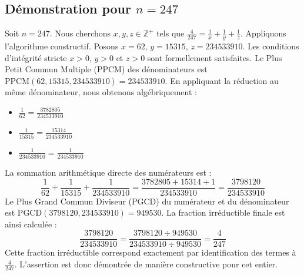 \documentclass[11pt,a4paper]{article}
\begin{document}
\subsection{Démonstration pour $n = 247$}
Soit $n = 247$. Nous cherchons $x, y, z \in \mathbb{Z}^{+}$ tels que $\frac{4}{247} = \frac{1}{x} + \frac{1}{y} + \frac{1}{z}$.
Appliquons l'algorithme constructif. Posons $x = 62$, $y = 15315$, $z = 234533910$.
Les conditions d'intégrité stricte $x > 0$, $y > 0$ et $z > 0$ sont formellement satisfaites.
Le Plus Petit Commun Multiple (PPCM) des dénominateurs est $\text{PPCM}(62, 15315, 234533910) = 234533910$.
En appliquant la réduction au même dénominateur, nous obtenons algébriquement :
\begin{itemize}
    \item $\frac{1}{62} = \frac{3782805}{234533910}$
    \item $\frac{1}{15315} = \frac{15314}{234533910}$
    \item $\frac{1}{234533910} = \frac{1}{234533910}$
\end{itemize}
La sommation arithmétique directe des numérateurs est :
$$ \frac{1}{62} + \frac{1}{15315} + \frac{1}{234533910} = \frac{3782805 + 15314 + 1}{234533910} = \frac{3798120}{234533910} $$
Le Plus Grand Commun Diviseur (PGCD) du numérateur et du dénominateur est $\text{PGCD}(3798120, 234533910) = 949530$.
La fraction irréductible finale est ainsi calculée :
$$ \frac{3798120}{234533910} = \frac{3798120 \div 949530}{234533910 \div 949530} = \frac{4}{247} $$
Cette fraction irréductible correspond exactement par identification des termes à $\frac{4}{247}$. L'assertion est donc démontrée de manière constructive pour cet entier.
\end{document}
